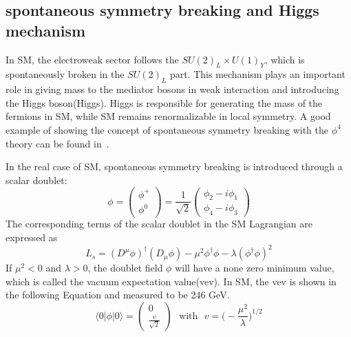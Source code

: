 \subsection{spontaneous symmetry breaking and Higgs mechanism}

In SM, the electroweak sector follows the $SU(2)_{L}\times U(1)_{Y}$, which is spontaneously broken in the $SU(2)_{L}$ part. This mechanism plays an important role in giving mass to the mediator bosons in weak interaction and introducing the Higgs boson(Higgs).  Higgs is responsible for generating the mass of the fermions in SM, while SM remains renormalizable in local symmetry. A good example of showing the concept of spontaneous symmetry breaking with the $\phi^{4}$ theory can be found in~\cite{Peskin:1995ev}.

In the real case of SM, spontaneous symmetry breaking is introduced through a scalar doublet:
\[
\phi=
\begin{pmatrix}
\phi^{+}\\
\phi^{0}
\end{pmatrix}
=\frac{1}{\sqrt{2}}
\begin{pmatrix}
\phi_{2}-i\phi_{1}\\
\phi_{4}-i\phi_{3}
\end{pmatrix}
\]
The corresponding terms of the scalar doublet in the SM Lagrangian are expressed as
\begin{equation}
L_{s}=(D^{\mu}\phi)^{\dagger}(D_{\mu}\phi)-\mu^{2}\phi^{\dagger}\phi-\lambda(\phi^{\dagger}\phi)^{2}
\end{equation}
If $\mu^{2}<0$ and $\lambda>0$, the doublet field $\phi$ will have a none zero minimum value, which is called the vacuum expectation value(vev). In SM, the vev is shown in the following Equation and measured to be 246 GeV.
\begin{equation}\label{vev}
\langle 0 | \phi | 0 \rangle   =
\begin{pmatrix}
0\\
\frac{v}{\sqrt{2}}
\end{pmatrix}
~~~\textrm{with} ~~~  v=
\bigg(-\frac{\mu^{2}}{\lambda}\bigg)^{1/2}
\end{equation}

